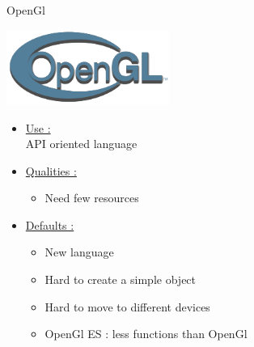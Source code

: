 \documentclass[a4paper,10pt]{beamer}
\begin{document}
			\begin{frame}{OpenGl}
				\begin{multicols}{2}
					\includegraphics[height=70pt]{images/logos/OpenGL_logo.png}\\
					
					\columnbreak 
					
					\begin{itemize}
						\item \underline{Use :}\\		
						API oriented language			
						\item \underline{Qualities :}\\
						\begin{itemize}
							\item Need few resources
						\end{itemize}
					\end{itemize}		 
				\end{multicols}
				\begin{itemize}
					\item \underline{Defaults :}\\
					\begin{itemize}
						\item New language
						\item Hard to create a simple object
						\item Hard to move to different devices
						\item OpenGl ES : less functions than OpenGl
					\end{itemize}
				\end{itemize}
			\end{frame}
			
\end{document}
